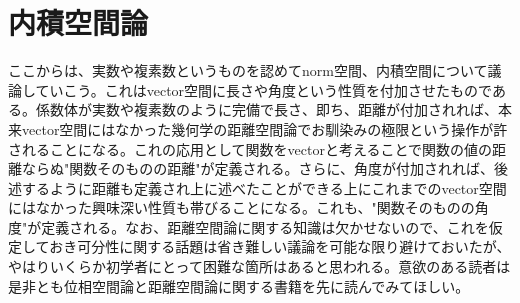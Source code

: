 \documentclass[a4paper]{jsarticle}
\begin{document}
\section{内積空間論}
ここからは、実数や複素数というものを認めてnorm空間、内積空間について議論していこう。これはvector空間に長さや角度という性質を付加させたものである。係数体が実数や複素数のように完備で長さ、即ち、距離が付加されれば、本来vector空間にはなかった幾何学の距離空間論でお馴染みの極限という操作が許されることになる。これの応用として関数をvectorと考えることで関数の値の距離ならぬ"関数そのものの距離"が定義される。さらに、角度が付加されれば、後述するように距離も定義され上に述べたことができる上にこれまでのvector空間にはなかった興味深い性質も帯びることになる。これも、"関数そのものの角度"が定義される。なお、距離空間論に関する知識は欠かせないので、これを仮定しておき可分性に関する話題は省き難しい議論を可能な限り避けておいたが、やはりいくらか初学者にとって困難な箇所はあると思われる。意欲のある読者は是非とも位相空間論と距離空間論に関する書籍を先に読んでみてほしい。
\end{document}
